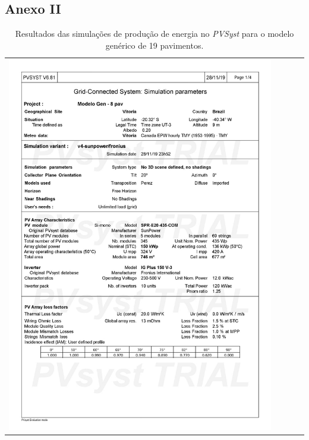 \subsection{Anexo II}
\begin{table}[H]
    \centering
    \caption{Resultados das simulações de produção de energia no \textit{PVSyst} para o modelo genérico de 19 pavimentos.}
    \begin{tabular}{l}
        \includegraphics[width=0.9\textwidth]{figures/attachments/resultpv21.jpg}
    \end{tabular}
    \label{tab:22}
\end{table}
\pagebreak
